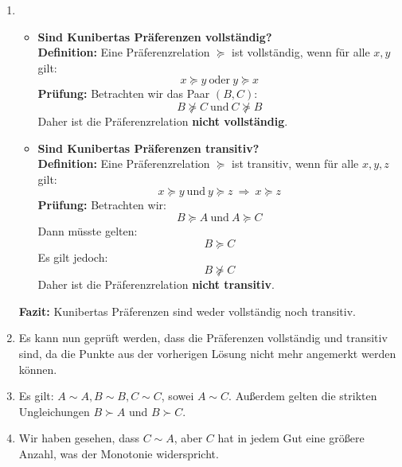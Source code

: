 \begin{solution}
	\noindent
	\begin{enumerate}
		\item

		      \begin{itemize}
			      \item \textbf{Sind Kunibertas Präferenzen vollständig?}\\
			            \textbf{Definition:} Eine Präferenzrelation $\succeq$ ist vollständig, wenn für alle $x, y$ gilt:
			            \[
				            x \succeq y \ \text{oder} \ y \succeq x
			            \]
			            \textbf{Prüfung:}
			            Betrachten wir das Paar $(B, C)$:
			            \[
				            B \nsucceq C \ \text{und} \ C \nsucceq B
			            \]
			            Daher ist die Präferenzrelation \textbf{nicht vollständig}.

			      \item \textbf{Sind Kunibertas Präferenzen transitiv?}\\
			            \textbf{Definition:} Eine Präferenzrelation $\succeq$ ist transitiv, wenn für alle $x, y, z$ gilt:
			            \[
				            x \succeq y \ \text{und} \ y \succeq z \ \Rightarrow\  x \succeq z
			            \]
			            \textbf{Prüfung:}
			            Betrachten wir:
			            \[
				            B \succeq A \ \text{und} \ A \succeq C
			            \]
			            Dann müsste gelten:
			            \[
				            B \succeq C
			            \]
			            Es gilt jedoch:
			            \[
				            B \nsucceq C
			            \]
			            Daher ist die Präferenzrelation \textbf{nicht transitiv}.
		      \end{itemize}

		      \textbf{Fazit:} Kunibertas Präferenzen sind weder vollständig noch transitiv.
		\item Es kann nun geprüft werden, dass die Präferenzen vollständig und transitiv sind, da die Punkte aus der vorherigen Lösung nicht mehr angemerkt werden können.
		\item Es gilt: $A \sim A, B \sim B, C \sim C$, sowei $A  \sim C$. Außerdem gelten die strikten Ungleichungen $B \succ A$ und $B \succ C$.
		\item Wir haben gesehen, dass $C \sim A$, aber $C$ hat in jedem Gut eine größere Anzahl, was der Monotonie widerspricht.
	\end{enumerate}

\end{solution}



